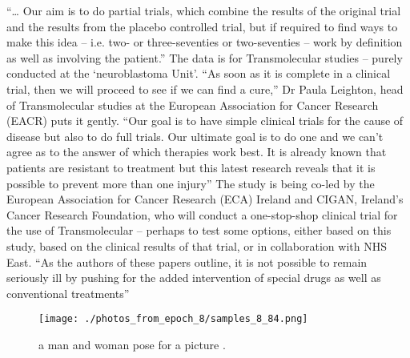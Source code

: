 \documentclass{article}%
\begin{document}
“… Our aim is to do partial trials, which combine the results of the original trial and the results from the placebo controlled trial, but if required to find ways to make this idea – i.e. two{-} or three{-}seventies or two{-}seventies – work by definition as well as involving the patient.”\newline%
The data is for Transmolecular studies – purely conducted at the ‘neuroblastoma Unit’.\newline%
“As soon as it is complete in a clinical trial, then we will proceed to see if we can find a cure,” Dr Paula Leighton, head of Transmolecular studies at the European Association for Cancer Research (EACR) puts it gently.\newline%
“Our goal is to have simple clinical trials for the cause of disease but also to do full trials. Our ultimate goal is to do one and we can’t agree as to the answer of which therapies work best. It is already known that patients are resistant to treatment but this latest research reveals that it is possible to prevent more than one injury”\newline%
The study is being co{-}led by the European Association for Cancer Research (ECA) Ireland and CIGAN, Ireland’s Cancer Research Foundation, who will conduct a one{-}stop{-}shop clinical trial for the use of Transmolecular – perhaps to test some options, either based on this study, based on the clinical results of that trial, or in collaboration with NHS East.\newline%
“As the authors of these papers outline, it is not possible to remain seriously ill by pushing for the added intervention of special drugs as well as conventional treatments”\newline%

%


\begin{figure}[h!]%
\centering%
\texttt{[image: ./photos\_from\_epoch\_8/samples\_8\_84.png]}%
\caption{a man and woman pose for a picture .}%
\end{figure}

%
\end{document}
